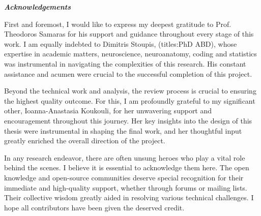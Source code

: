\thispagestyle{plain}
\begin{center}
    \LARGE
    \textit{\textbf{Acknowledgements}}
        
    \vspace{0.4cm}
\end{center}
\normalsize

\vspace{0.9cm}

First and foremost, I would like to express my deepest gratitude to Prof. Theodoros Samaras for his support and guidance throughout every stage of this work. I am equally indebted to Dimitris Stoupis, (titles:PhD ABD), whose expertise in academic matters, neuroscience, neuroanatomy, coding and statistics was instrumental in navigating the complexities of this research. His constant assistance and acumen were crucial to the successful completion of this project.

Beyond the technical work and analysis, the review process is crucial to ensuring the highest quality outcome. For this, I am profoundly grateful to my significant other, Ioanna-Anastasia Koukouli, for her unwavering support and encouragement throughout this journey. Her key insights into the design of this thesis were instrumental in shaping the final work, and her thoughtful input greatly enriched the overall direction of the project.

In any research endeavor, there are often unsung heroes who play a vital role behind the scenes. I believe it is essential to acknowledge them here. The open knowledge and open-source communities deserve special recognition for their immediate and high-quality support, whether through forums or mailing lists. Their collective wisdom greatly aided in resolving various technical challenges. I hope all contributors have been given the deserved credit.

\vspace*{\fill}

